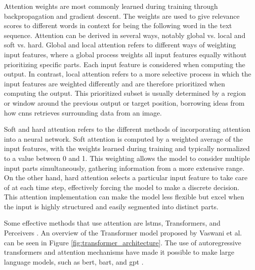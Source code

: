     Attention weights are most commonly learned during training through backpropagation and gradient descent. The weights are used to give relevance scores to different words in context for being the following word in the text sequence. Attention can be derived in several ways, notably global vs. local and soft vs. hard. Global and local attention refers to different ways of weighting input features, where a global process weights all input features equally without prioritizing specific parts. Each input feature is considered when computing the output.
    In contrast, local attention refers to a more selective process in which the input features are weighted differently and are therefore prioritized when computing the output. This prioritized subset is usually determined by a region or window around the previous output or target position, borrowing ideas from how \glspl{cnn} retrieves surrounding data from an image.
    
    Soft and hard attention refers to the different methods of incorporating attention into a neural network. Soft attention is computed by a weighted average of the input features, with the weights learned during training and typically normalized to a value between 0 and 1. This weighting allows the model to consider multiple input parts simultaneously, gathering information from a more extensive range. On the other hand, hard attention selects a particular input feature to take care of at each time step, effectively forcing the model to make a discrete decision. This attention implementation can make the model less flexible but excel when the input is highly structured and easily segmented into distinct parts. 
    
    Some effective methods that use attention are \glspl{lstm}, Transformers, and Perceivers \cite{hochreiterLongShorttermMemory1997, vaswaniAttentionAllYou2017, jaeglePerceiverGeneralPerception2021}. An overview of the Transformer model proposed by Vaswani et al. \cite{vaswaniAttentionAllYou2017} can be seen in Figure \ref{fig:transformer_architecture}. The use of autoregressive transformers and attention mechanisms have made it possible to make large language models, such as \gls{bert}, \gls{bart}, and \gls{gpt} \cite{devlinBERTPretrainingDeep2019, lewisBARTDenoisingSequencetoSequence2019, radfordImprovingLanguageUnderstanding2018, radfordLanguageModelsAre2019, brownLanguageModelsAre2020, openaiGPT4TechnicalReport2023}. 

